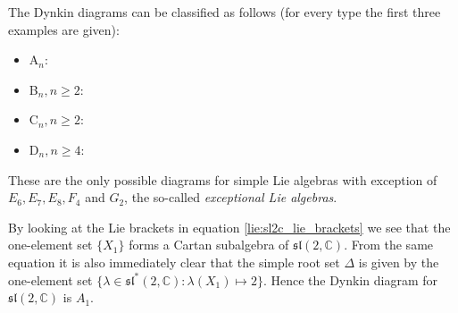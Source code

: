     \begin{property}[Classification]
        The Dynkin diagrams can be classified as follows (for every type the first three examples are given):
        \begin{itemize}
            \item A$_n$: \begin{center}\dynk {}  \end{center}
        \item B$_n, n\geq2$: \begin{center}   \end{center}
        \item C$_n, n\geq2$: \begin{center}   \end{center}
        \item D$_n, n\geq4$: \begin{center}   \end{center}
        \end{itemize}
        These are the only possible diagrams for simple Lie algebras with exception of $E_6,E_7,E_8,F_4$ and $G_2$, the so-called \textit{exceptional Lie algebras}.
    \end{property}

    \begin{example}
        By looking at the Lie brackets in equation \ref{lie:sl2c_lie_brackets} we see that the one-element set $\{X_1\}$ forms a Cartan subalgebra of $\mathfrak{sl}(2,\mathbb{C})$. From the same equation it is also immediately clear that the simple root set $\Delta$ is given by the one-element set $\{\lambda\in\mathfrak{sl}^*(2, \mathbb{C}): \lambda(X_1)\mapsto 2\}$. Hence the Dynkin diagram for $\mathfrak{sl}(2, \mathbb{C})$ is $A_1$.
    \end{example}

